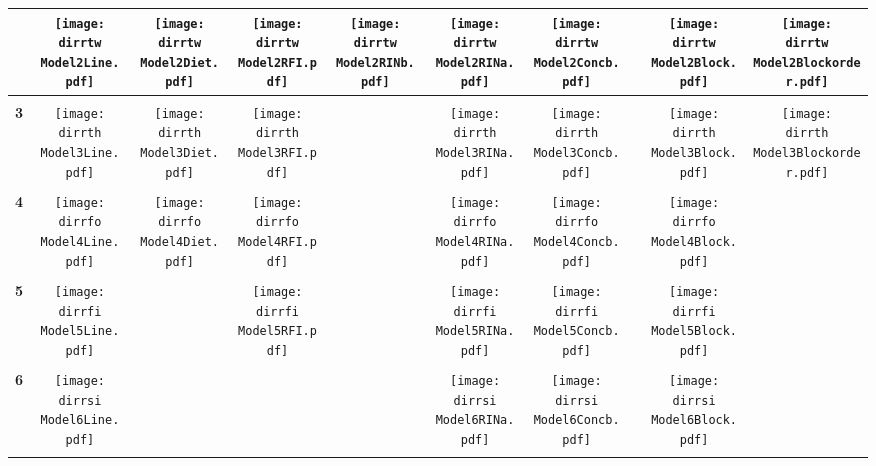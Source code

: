 \documentclass[landscape]{article}
\def \dirrtw {U:/R/RA/Data/RFI-newdata/resultpairednocbc/Model2.Line.Diet.RFI.Concb.RINb.RINa.Block.Blockorder/}
\def \dirrth {U:/R/RA/Data/RFI-newdata/resultpairednocbc/Model3.Line.Diet.RFI.Concb.RINa.Block.Blockorder/}
\def \dirrfo {U:/R/RA/Data/RFI-newdata/resultpairednocbc/Model4.Line.Diet.RFI.Concb.RINa.Block/}
\def \dirrfi {U:/R/RA/Data/RFI-newdata/resultpairednocbc/Model5.Line.RFI.Concb.RINa.Block/}
\def \dirrsi{U:/R/RA/Data/RFI-newdata/resultpairednocbc/Model6.Line.Concb.RINa.Block/}
\begin{document}
\begin{table}
\begin{tabular}{cccccccccc}
      &\texttt{[image: \\dirrtw Model2Line.pdf]}
      &\texttt{[image: \\dirrtw Model2Diet.pdf]}
      &\texttt{[image: \\dirrtw Model2RFI.pdf]}
      &\texttt{[image: \\dirrtw Model2RINb.pdf]}
      &\texttt{[image: \\dirrtw Model2RINa.pdf]}
      &\texttt{[image: \\dirrtw Model2Concb.pdf]}
      &
      &\texttt{[image: \\dirrtw Model2Block.pdf]}
      &\texttt{[image: \\dirrtw Model2Blockorder.pdf]}
     \\[3.5pt]
     \hline
     \\[3.5pt]
      {\Huge \textbf{3}} 
      &\texttt{[image: \\dirrth Model3Line.pdf]}
      &\texttt{[image: \\dirrth Model3Diet.pdf]}
      &\texttt{[image: \\dirrth Model3RFI.pdf]}
      &
      &\texttt{[image: \\dirrth Model3RINa.pdf]}
      &\texttt{[image: \\dirrth Model3Concb.pdf]}
      &
      &\texttt{[image: \\dirrth Model3Block.pdf]}
      &\texttt{[image: \\dirrth Model3Blockorder.pdf]}
      \\[3.5pt]
     \hline
     \\[3.5pt]
     {\Huge \textbf{4}} 
      &\texttt{[image: \\dirrfo Model4Line.pdf]}
      &\texttt{[image: \\dirrfo Model4Diet.pdf]}
      &\texttt{[image: \\dirrfo Model4RFI.pdf]}
      &
      &\texttt{[image: \\dirrfo Model4RINa.pdf]}
      &\texttt{[image: \\dirrfo Model4Concb.pdf]}
      &
      &\texttt{[image: \\dirrfo Model4Block.pdf]}
      &
     \\[3.5pt]
     \hline
     \\[3.5pt]
     {\Huge \textbf{5}} 
      &\texttt{[image: \\dirrfi Model5Line.pdf]}
      &
      &\texttt{[image: \\dirrfi Model5RFI.pdf]}
      &
      &\texttt{[image: \\dirrfi Model5RINa.pdf]}
      &\texttt{[image: \\dirrfi Model5Concb.pdf]}
      &
      &\texttt{[image: \\dirrfi Model5Block.pdf]}
      &
     \\[3.5pt]
     \hline
     \\[3.5pt]
     {\Huge \textbf{6}} 
      &\texttt{[image: \\dirrsi Model6Line.pdf]}
      &
      &
      &
      &\texttt{[image: \\dirrsi Model6RINa.pdf]}
      &\texttt{[image: \\dirrsi Model6Concb.pdf]}
      &
      &\texttt{[image: \\dirrsi Model6Block.pdf]}
      &
     \\[3.5pt]
     \hline
     \\[3.5pt]
     
\end{tabular}
\end{table}
\end{document}
